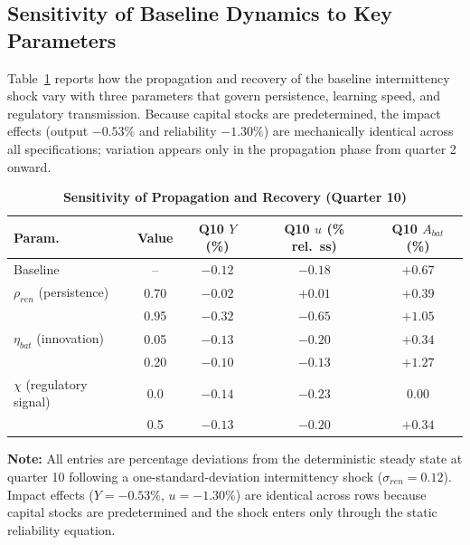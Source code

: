 	\subsection{Sensitivity of Baseline Dynamics to Key Parameters}
	
	Table~\ref{tab:baseline_sensitivity} reports how the propagation and recovery of the baseline intermittency shock vary with three parameters that govern persistence, learning speed, and regulatory transmission. Because capital stocks are predetermined, the impact effects (output $-0.53\%$ and reliability $-1.30\%$) are mechanically identical across all specifications; variation appears only in the propagation phase from quarter 2 onward.
	
	\begin{table}[H]
		\centering
		\caption[Sensitivity of Propagation and Recovery (Quarter 10)]{\textbf{Sensitivity of Propagation and Recovery (Quarter 10)}}
		\label{tab:baseline_sensitivity}
		\renewcommand{\arraystretch}{1.3}
		\small
		\begin{tabular}{l c c c c}
			\toprule
			\textbf{Param.} & \textbf{Value} & \textbf{Q10 $Y$ (\%)} & \textbf{Q10 $u$ (\% rel.\ ss)} & \textbf{Q10 $A_{bat}$ (\%)} \\
			\midrule
			Baseline & -- & $-0.12$ & $-0.18$ & $+0.67$ \\
			\midrule
			$\rho_{ren}$ (persistence) & 0.70 & $-0.02$ & $+0.01$ & $+0.39$ \\
			& 0.95 & $-0.32$ & $-0.65$ & $+1.05$ \\
			\midrule
			$\eta_{bat}$ (innovation) & 0.05 & $-0.13$ & $-0.20$ & $+0.34$ \\
			& 0.20 & $-0.10$ & $-0.13$ & $+1.27$ \\
			\midrule
			$\chi$ (regulatory signal) & 0.0 & $-0.14$ & $-0.23$ & 0.00 \\
			& 0.5 & $-0.13$ & $-0.20$ & $+0.34$ \\
			\bottomrule
		\end{tabular}
		\vspace{0.2cm}
		\parbox{\textwidth}{\footnotesize \textbf{Note:} All entries are percentage deviations from the deterministic steady state at quarter 10 following a one-standard-deviation intermittency shock ($\sigma_{ren}=0.12$). Impact effects ($Y=-0.53\%$, $u=-1.30\%$) are identical across rows because capital stocks are predetermined and the shock enters only through the static reliability equation.}
	\end{table}
	
